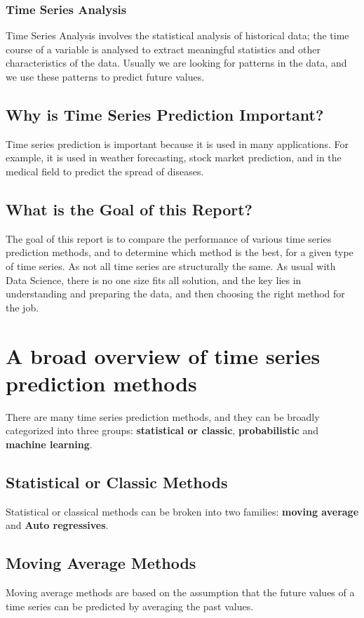 \documentclass[manuscript,screen,nonacm]{acmart}
\numberwithin{equation}{section}
\begin{document}
\subsubsection{Time Series Analysis}
Time Series Analysis involves the statistical analysis of historical data; the time course of a variable is analysed to extract meaningful statistics and other characteristics of the data.
Usually we are looking for patterns in the data, and we use these patterns to predict future values.


\subsection{Why is Time Series Prediction Important?}
Time series prediction is important because it is used in many applications.
For example, it is used in weather forecasting, stock market prediction, and in the medical field to predict the spread of diseases.
\subsection{What is the Goal of this Report?}
The goal of this report is to compare the performance of various
time series prediction methods, and to determine which method is the best,
for a given type of time series. As not all time series are structurally
the same. As usual with Data Science, there is no one size fits all solution,
and the key lies in understanding and preparing the data, and then
choosing the right method for the job.


\section{A broad overview of time series prediction methods}
\label{sec:overview}
There are many time series prediction methods, and they can be broadly
categorized into three groups: \textbf{statistical or classic}, \textbf{probabilistic} and \textbf{machine learning}.
\subsection{Statistical or Classic Methods}
Statistical or classical methods can be broken into two families: \textbf{moving average} and \textbf{Auto regressives}.




\subsection*{Moving Average Methods}
Moving average methods are based on the assumption that the future values of a time series can be predicted by averaging the past values.
\end{document}
